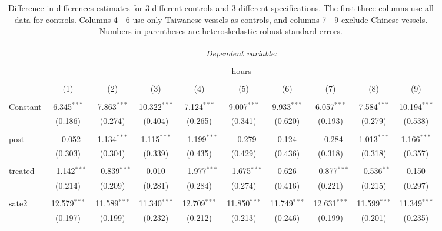 \documentclass[11pt,]{article}
\begin{document}
\clearpage
\begin{landscape}


\begin{table}[!htbp] \centering 
  \caption{Difference-in-differences estimates for 3 different controls and 3 different specifications. The first three columns use all data for controls. Columns 4 - 6 use only Taiwanese vessels as controls, and columns 7 - 9 exclude Chinese vessels. Numbers in parentheses are heteroskedastic-robust standard errors.} 
  \label{} 
\small 
\begin{tabular}{@{\extracolsep{1pt}}lccccccccc} 
\\[-1.8ex]\hline 
\hline \\[-1.8ex] 
 & \multicolumn{9}{c}{\textit{Dependent variable:}} \\ 
\cline{2-10} 
\\[-1.8ex] & \multicolumn{9}{c}{hours} \\ 
\\[-1.8ex] & (1) & (2) & (3) & (4) & (5) & (6) & (7) & (8) & (9)\\ 
\hline \\[-1.8ex] 
 Constant & 6.345$^{***}$ & 7.863$^{***}$ & 10.322$^{***}$ & 7.124$^{***}$ & 9.007$^{***}$ & 9.933$^{***}$ & 6.057$^{***}$ & 7.584$^{***}$ & 10.194$^{***}$ \\ 
  & (0.186) & (0.274) & (0.404) & (0.265) & (0.341) & (0.620) & (0.193) & (0.279) & (0.538) \\ 
  & & & & & & & & & \\ 
 post & $-$0.052 & 1.134$^{***}$ & 1.115$^{***}$ & $-$1.199$^{***}$ & $-$0.279 & 0.124 & $-$0.284 & 1.013$^{***}$ & 1.166$^{***}$ \\ 
  & (0.303) & (0.304) & (0.339) & (0.435) & (0.429) & (0.436) & (0.318) & (0.318) & (0.357) \\ 
  & & & & & & & & & \\ 
 treated & $-$1.142$^{***}$ & $-$0.839$^{***}$ & 0.010 & $-$1.977$^{***}$ & $-$1.675$^{***}$ & 0.626 & $-$0.877$^{***}$ & $-$0.536$^{**}$ & 0.150 \\ 
  & (0.214) & (0.209) & (0.281) & (0.284) & (0.274) & (0.416) & (0.221) & (0.215) & (0.297) \\ 
  & & & & & & & & & \\ 
 sate2 & 12.579$^{***}$ & 11.589$^{***}$ & 11.340$^{***}$ & 12.709$^{***}$ & 11.850$^{***}$ & 11.749$^{***}$ & 12.631$^{***}$ & 11.599$^{***}$ & 11.349$^{***}$ \\ 
  & (0.197) & (0.199) & (0.232) & (0.212) & (0.213) & (0.246) & (0.199) & (0.201) & (0.235) \\ 

\end{tabular}
\end{table}
\end{landscape}
\end{document}
